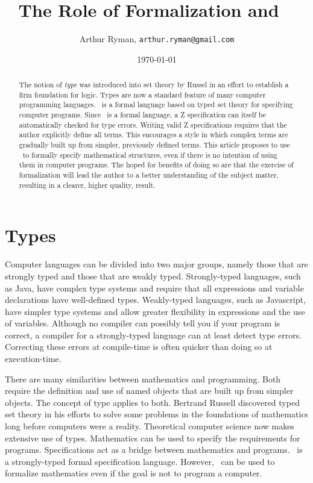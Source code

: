 \documentclass[11pt, oneside]{article}
\title{The Role of Formalization and \Zed\ }
\author{Arthur Ryman, {\tt arthur.ryman@gmail.com}}
\date{\today}
\begin{document}
\maketitle

\begin{abstract}
The notion of {\it type} was introduced into set theory by Russel in an effort to establish a firm foundation for logic.
Types are now a standard feature of many computer programming languages.
\Zed\  is a formal language based on typed set theory for specifying computer programs.
Since \Zed\  is a formal language, a Z specification can itself be automatically checked for type errors.
Writing valid Z specifications requires that the author explicitly define all terms.
This encourages a style in which complex terms are gradually built up from simpler, previously defined terms.
This article proposes to use \Zed\  to formally specify mathematical structures, even if there is no intention of using
them in computer programs.
The hoped for benefits of doing so are that the exercise of formalization will lead the author to a better understanding of the subject
matter, resulting in a clearer, higher quality, result.
\end{abstract}

\tableofcontents

\section{Types}

Computer languages can be divided into two major groups, namely those that are strongly typed and those that are weakly typed.
Strongly-typed languages, such as Java, have complex type systems and require that all expressions and variable declarations 
have well-defined types.
Weakly-typed languages, such as Javascript, have simpler type systems and allow greater flexibility in expressions and the use of variables.
Although no compiler can possibly tell you if your program is correct, a compiler for a strongly-typed language can at least detect type errors.
Correcting these errors at compile-time is often quicker than doing so at execution-time.

There are many similarities between mathematics and programming. 
Both require the definition and use of named objects that are built up from simpler objects.
The concept of type applies to both.
Bertrand Russell discovered typed set theory in his efforts to solve some problems in the foundations of mathematics 
long before computers were a reality.
Theoretical computer science now makes extensive use of types.
Mathematics can be used to specify the requirements for programs.
Specifications act as a bridge between mathematics and programs.
\Zed\  is a strongly-typed formal specification language.
However, \Zed\  can be used to formalize mathematics even if the goal is not to program a computer.
\end{document}
